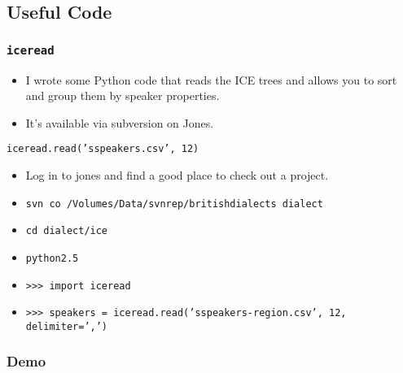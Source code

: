 \documentclass{beamer}
\begin{document}
\subsection{Useful Code}
\begin{frame}
  \frametitle{\tt iceread}
  \begin{itemize}
  \item I wrote some Python code that reads the ICE trees and allows you
    to sort and group them by speaker properties.
  \item It's available via subversion on Jones.
  \end{itemize}
\end{frame}
\begin{frame}
\begin{example}
    {\tt iceread.read('sspeakers.csv', 12)}
\end{example}
  \begin{itemize}
    \item Log in to jones and find a good place to check out a
      project.
  \item {\tt svn co /Volumes/Data/svnrep/britishdialects dialect}
    \item {\tt cd dialect/ice}
    \item {\tt python2.5} %
    \item {\tt >>> import iceread}
    \item {\tt >>> speakers = iceread.read('sspeakers-region.csv', 12,
        delimiter=',')}
  \end{itemize} %
\end{frame}
\begin{frame}
  \frametitle{Demo}
\end{frame}
\end{document}
